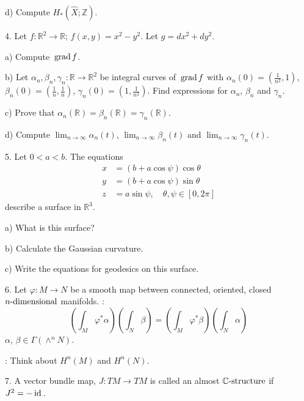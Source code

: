 \documentclass[12pt]{article}
\def\R{{\mathbb R}}
\def\Z{{\mathbb Z}}
\def\C{{\mathbb C}}
\def\grad{{\hbox{\,grad\,}}}
\def\id{{\hbox{\,id\,}}}
\begin{document}
\begin{large}
\begin{description}
{\item \quad d)
Compute $H_\ast(\widehat X;\Z)$.

\item 4.
Let $f:\R^2\to\R$; $f(x,y)=x^2-y^2$. Let $g=dx^2+dy^2$.

\item\quad a)
Compute $\grad f$.

\item\quad b)
Let $\alpha_n, \beta_n, \gamma_n:\R\to\R^2$ be integral curves of $\grad f$
with $\alpha_n(0)=(\frac{1}{n^2},1)$, $\beta_n(0)=(\frac{1}{n},\frac{1}{n})$,
$\gamma_n(0)=(1,\frac{1}{n^2})$.
Find expressions for $\alpha_n$, $\beta_n$ and $\gamma_n$.

\item\quad c)
Prove that $\alpha_n(\R)=\beta_n(\R)=\gamma_n(\R)$.

\item\quad d)
Compute $\lim_{n\to\infty} \alpha_n(t)$, $\lim_{n\to\infty}\beta_n(t)$
and $\lim_{n\to\infty}\gamma_n(t)$.

\item 5.
Let $0<a<b$. The equations
$$\begin{aligned}
x&=(b+a\cos \psi)\cos \theta\\
y&=(b+a\cos \psi)\sin \theta\\
z&=a\sin \psi, \quad \theta,\psi\in[0,2\pi]
\end{aligned}$$
describe a surface in $\R^3$.

\item\quad a)
What is this surface?

\item\quad b)
Calculate the Gaussian curvature.

\item\quad c)
Write the equations for geodesics on this surface.

\item 6.
Let $\varphi:M\to N$ be a smooth map between connected, oriented, closed
$n\hbox{-dimensional}$ manifolds. :
$$ \left( \int_M \varphi^\ast\alpha \right) \left( \int_N\beta \right)
= \left( \int_M\varphi^\ast\beta \right) \left( \int_N\alpha \right)
$$
 $\alpha$, $\beta \in \Gamma(\wedge^n N)$.

: Think about $H^n(M)$ and $H^n(N)$.

\item 7.
A vector bundle map, $J:TM\to TM$ is called an almost $\C\hbox{-structure}$
if $J^2=-\id$.

}
\end{description}
\end{large}
\end{document}
